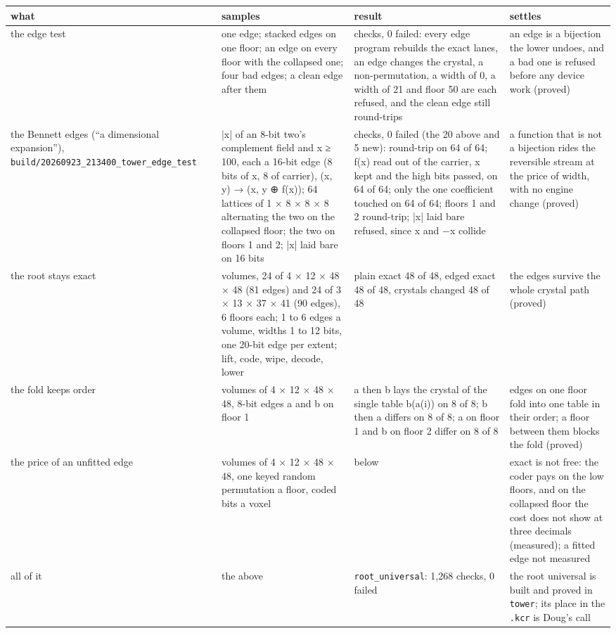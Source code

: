 {\footnotesize
\setlength{\tabcolsep}{6pt}
\begin{longtable}{>{\RaggedRight\arraybackslash}p{}>{\RaggedRight\arraybackslash}p{}>{\RaggedRight\arraybackslash}p{}>{\RaggedRight\arraybackslash}p{}}
\toprule
what & samples & result & settles \\
\midrule
\endhead
the edge test & one edge; stacked edges on one floor; an edge on every floor with the collapsed one; four bad edges; a clean edge after them & 20 checks, 0 failed: every edge program rebuilds the exact lanes, an edge changes the crystal, a non-permutation, a width of 0, a width of 21 and floor 50 are each refused, and the clean edge still round-trips & an edge is a bijection the lower undoes, and a bad one is refused before any device work (proved) \\
the Bennett edges (“a dimensional expansion”), \texttt{build/\allowbreak{}20260923\_\allowbreak{}213400\_\allowbreak{}tower\_\allowbreak{}edge\_\allowbreak{}test} & |x| of an 8-bit two's complement field and x ≥ 100, each a 16-bit edge (8 bits of x, 8 of carrier), (x, y) → (x, y ⊕ f(x)); 64 lattices of 1 × 8 × 8 × 8 alternating the two on the collapsed floor; the two on floors 1 and 2; |x| laid bare on 16 bits & 25 checks, 0 failed (the 20 above and 5 new): round-trip on 64 of 64; f(x) read out of the carrier, x kept and the high bits passed, on 64 of 64; only the one coefficient touched on 64 of 64; floors 1 and 2 round-trip; |x| laid bare refused, since x and −x collide & a function that is not a bijection rides the reversible stream at the price of width, with no engine change (proved) \\
the root stays exact & 48 volumes, 24 of 4 × 12 × 48 × 48 (81 edges) and 24 of 3 × 13 × 37 × 41 (90 edges), 6 floors each; 1 to 6 edges a volume, widths 1 to 12 bits, one 20-bit edge per extent; lift, code, wipe, decode, lower & plain exact 48 of 48, edged exact 48 of 48, crystals changed 48 of 48 & the edges survive the whole crystal path (proved) \\
the fold keeps order & 8 volumes of 4 × 12 × 48 × 48, 8-bit edges a and b on floor 1 & a then b lays the crystal of the single table b(a(i)) on 8 of 8; b then a differs on 8 of 8; a on floor 1 and b on floor 2 differ on 8 of 8 & edges on one floor fold into one table in their order; a floor between them blocks the fold (proved) \\
the price of an unfitted edge & 8 volumes of 4 × 12 × 48 × 48, one keyed random permutation a floor, coded bits a voxel & below & exact is not free: the coder pays on the low floors, and on the collapsed floor the cost does not show at three decimals (measured); a fitted edge not measured \\
all of it & the above & \texttt{root\_\allowbreak{}universal}: 1,268 checks, 0 failed & the root universal is built and proved in \texttt{tower}; its place in the \texttt{.\allowbreak{}kcr} is Doug's call \\
\bottomrule
\end{longtable}
}


